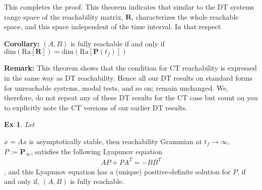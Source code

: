 \documentclass[twoside]{article}
\newtheorem{exmp}[theorem]{Ex}
\begin{document}
%
This completes the proof. This theorem indicates that similar to the DT systems range space of the
reachability matrix, $\mathbf{R}$, characterizes the whole reachable space, and this space independent
of the time interval. In that respect 

\textbf{Corollary:} $(A,B)$ is fully reachable if and only if $\mathrm{dim} \left( \mathrm{Ra} [ \mathbf{R} ] \right) = \mathrm{dim} \left( \mathrm{Ra} [ \textbf{P}(t_f) ] \right)$

\textbf{Remark:} This theorem shows that the condition for CT reachability is expressed in the same way 
as DT reachability. Hence all our DT results on standard forms for unreachable systems, modal tests, and so on; remain unchanged. We, therefore, do not repeat any of these DT results for the CT case but count on you to explicitly note the CT versions of our earlier DT results.

\begin{exmp}
Let 
\end{exmp}
$\dot{x} = A x$ is asymptotically stable, then reachability Grammian at $t_f \to \infty$, $P := \mathbf{P}_{\infty}$,
satisfies the following Lyapunov equation
%
\begin{align*}
    A P + P A^T = - B B^T
\end{align*}
% 
, and this Lyapunov equation has a (unique) positive-definite solution for $P$,
if and only if, $(A,B)$ is fully reachable.

\end{document}
